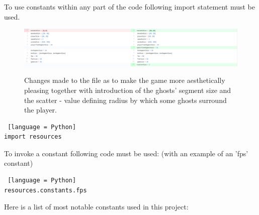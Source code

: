 \documentclass[11pt,a4paper,notitlepage]{report}
\newenvironment{img}{
	\begin{center}
		\begin{figure}[H]
			\begin{center}
			
}{
	\end{center}
		\end{figure}
			\end{center}
}
\begin{document}
				To use constants within any part of the code following import statement must be used.
				\begin{img}
					\includegraphics[width = 350pt]{images/fine-tuning-blame.png}\\
					\caption{Changes made to the file as to make the game more aesthetically pleasing together with introduction of the ghosts' segment size and the scatter - value defining radius by which some ghosts surround the player.}
				\end{img}
				\begin{lstlisting} [language = Python]
import resources
				\end{lstlisting}
				To invoke a constant following code must be used: (with an example of an 'fps' constant)
				\begin{lstlisting} [language = Python]
resources.constants.fps
				\end{lstlisting}
				Here is a list of most notable constants used in this project:
\end{document}
